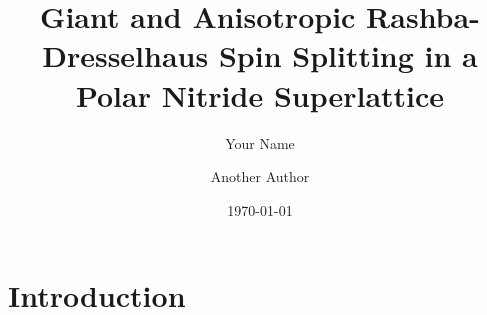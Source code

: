 \documentclass[aps,prl,reprint,superscriptaddress]{revtex4-2}
\begin{document}
\title{
    Giant and Anisotropic Rashba-Dresselhaus Spin Splitting in a Polar Nitride Superlattice}

\author{Your Name}

\author{Another Author}

\date{\today}

\maketitle

\section{Introduction}
\end{document}

